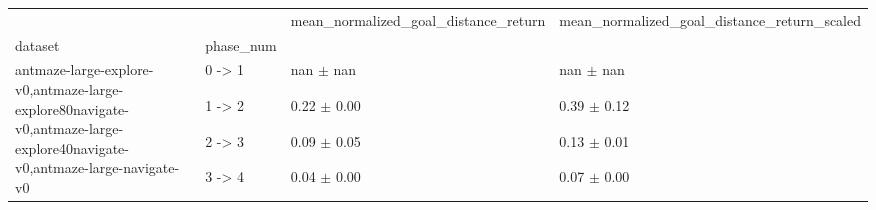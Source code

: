\begin{tabular}{llll}
\toprule
 &  & mean_normalized_goal_distance_return & mean_normalized_goal_distance_return_scaled \\
dataset & phase_num &  &  \\
\midrule
\multirow[t]{4}{*}{antmaze-large-explore-v0,antmaze-large-explore80navigate-v0,antmaze-large-explore40navigate-v0,antmaze-large-navigate-v0} & 0 -> 1 & nan $\pm$ nan & nan $\pm$ nan \\
 & 1 -> 2 & 0.22 $\pm$ 0.00 & 0.39 $\pm$ 0.12 \\
 & 2 -> 3 & 0.09 $\pm$ 0.05 & 0.13 $\pm$ 0.01 \\
 & 3 -> 4 & 0.04 $\pm$ 0.00 & 0.07 $\pm$ 0.00 \\
\cline{1-4}
\bottomrule
\end{tabular}
